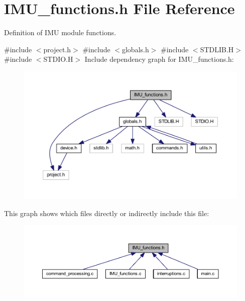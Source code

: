 \section{I\+M\+U\+\_\+functions.\+h File Reference}
\label{_i_m_u__functions_8h}


Definition of I\+MU module functions.  


{\ttfamily \#include $<$project.\+h$>$}\newline
{\ttfamily \#include $<$globals.\+h$>$}\newline
{\ttfamily \#include $<$S\+T\+D\+L\+I\+B.\+H$>$}\newline
{\ttfamily \#include $<$S\+T\+D\+I\+O.\+H$>$}\newline
Include dependency graph for I\+M\+U\+\_\+functions.\+h\+:
\nopagebreak
\begin{figure}[H]
\begin{center}
\leavevmode
\includegraphics[width=350pt]{_i_m_u__functions_8h__incl}
\end{center}
\end{figure}
This graph shows which files directly or indirectly include this file\+:
\nopagebreak
\begin{figure}[H]
\begin{center}
\leavevmode
\includegraphics[width=350pt]{_i_m_u__functions_8h__dep__incl}
\end{center}
\end{figure}
